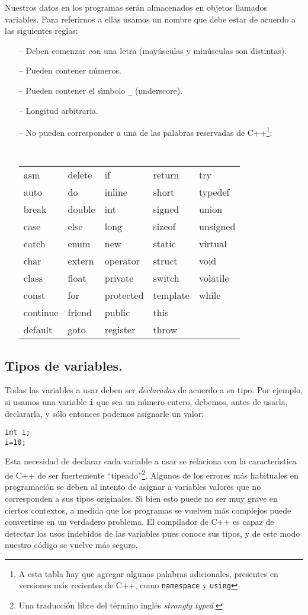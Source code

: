 Nuestros datos en los programas ser{\'a}n almacenados en objetos llamados
variables. Para referirnos a ellas usamos un nombre que debe estar de
acuerdo a las siguientes reglas:
\begin{itemize}
\item[--] Deben comenzar con una letra (may{\'u}sculas y min{\'u}sculas
son distintas).
\item[--] Pueden contener n{\'u}meros.
\item[--] Pueden contener el s\'{\i}mbolo \verb+_+ (underscore).
\item[--] Longitud arbitraria.
\item[--] No pueden corresponder a una de las palabras reservadas
de C++\footnote{A esta tabla hay que agregar algunas palabras
  adicionales, presentes en versiones m\'as recientes de C++, como
  {\tt namespace} y {\tt using}}:

{\tt 
\begin{tabular}{lllll}
asm & delete & if & return & try \\
auto & do & inline & short & typedef \\
break & double & int & signed & union \\
case & else & long & sizeof & unsigned \\
catch & enum & new & static & virtual \\
char & extern & operator & struct & void \\
class & float & private & switch & volatile \\
const & for & protected & template & while \\
continue & friend & public & this \\
default & goto & register & throw
\end{tabular}}
\end{itemize}

\subsection{Tipos de variables.}

Todas las variables a usar deben ser {\em declaradas\/} de acuerdo a
su tipo. Por ejemplo, si usamos una variable \verb+i+ que sea un
n{\'u}mero entero, debemos, antes de usarla, declararla, y s{\'o}lo
entonces podemos asignarle un valor:
\begin{verbatim}
int i;
i=10;
\end{verbatim}
Esta necesidad de declarar cada variable a usar se relaciona con la
caracter\'{\i}stica de C++ de ser fuertemente ``tipeado''\footnote{Una
  traducci\'on libre del t\'ermino ingl\'es {\em strongly
    typed}.}. Algunos de los errores m\'as habituales en programaci\'on
se deben al intento de asignar a variables valores que no
corresponden a sus tipos originales. Si bien esto puede no ser muy
grave en ciertos contextos, a medida que los programas se vuelven
m\'as complejos puede convertirse en un verdadero problema. El
compilador de C++ es capaz de detectar los usos indebidos de las
variables pues conoce sus tipos, y de este modo nuestro c\'odigo se
vuelve m\'as seguro. 


